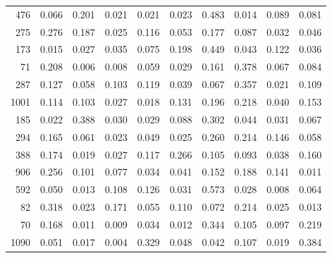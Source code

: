 \begin{longtable}{rrrrrrrrrr}
   476 & 0.066 & 0.201 & 0.021 & 0.021 & 0.023 & 0.483 & 0.014 & 0.089 & 0.081 \\
   275 & 0.276 & 0.187 & 0.025 & 0.116 & 0.053 & 0.177 & 0.087 & 0.032 & 0.046 \\
   173 & 0.015 & 0.027 & 0.035 & 0.075 & 0.198 & 0.449 & 0.043 & 0.122 & 0.036 \\
    71 & 0.208 & 0.006 & 0.008 & 0.059 & 0.029 & 0.161 & 0.378 & 0.067 & 0.084 \\
   287 & 0.127 & 0.058 & 0.103 & 0.119 & 0.039 & 0.067 & 0.357 & 0.021 & 0.109 \\
  1001 & 0.114 & 0.103 & 0.027 & 0.018 & 0.131 & 0.196 & 0.218 & 0.040 & 0.153 \\
   185 & 0.022 & 0.388 & 0.030 & 0.029 & 0.088 & 0.302 & 0.044 & 0.031 & 0.067 \\
   294 & 0.165 & 0.061 & 0.023 & 0.049 & 0.025 & 0.260 & 0.214 & 0.146 & 0.058 \\
   388 & 0.174 & 0.019 & 0.027 & 0.117 & 0.266 & 0.105 & 0.093 & 0.038 & 0.160 \\
   906 & 0.256 & 0.101 & 0.077 & 0.034 & 0.041 & 0.152 & 0.188 & 0.141 & 0.011 \\
   592 & 0.050 & 0.013 & 0.108 & 0.126 & 0.031 & 0.573 & 0.028 & 0.008 & 0.064 \\
    82 & 0.318 & 0.023 & 0.171 & 0.055 & 0.110 & 0.072 & 0.214 & 0.025 & 0.013 \\
    70 & 0.168 & 0.011 & 0.009 & 0.034 & 0.012 & 0.344 & 0.105 & 0.097 & 0.219 \\
  1090 & 0.051 & 0.017 & 0.004 & 0.329 & 0.048 & 0.042 & 0.107 & 0.019 & 0.384 \\
\end{longtable}
